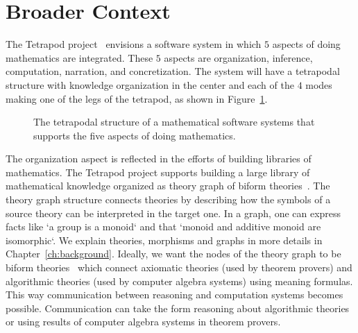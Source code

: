 \section{Broader Context}
\label{sec:broader_context}
The Tetrapod project~\cite{carette2020bigMath} envisions a software system in which $5$ aspects of doing mathematics are integrated. These $5$ aspects are organization, inference, computation, narration, and concretization. The system will have a tetrapodal structure with knowledge organization in the center and each of the $4$ modes making one of the legs of the tetrapod, as shown in Figure~\ref{fig:tetrapod}. 
\begin{figure}[h]
\caption{The tetrapodal structure of a mathematical software systems that supports the five aspects of doing mathematics. }
\label{fig:tetrapod}
\end{figure}

The organization aspect is reflected in the efforts of building libraries of mathematics. The Tetrapod project supports building a large library of mathematical knowledge organized as theory graph of biform theories~\cite{biformCICM2018}. The theory graph structure connects theories by describing how the symbols of a source theory can be interpreted in the target one. In a graph, one can express facts like `a group is a monoid` and that `monoid and additive monoid are isomorphic`. We explain theories, morphisms and graphs in more details in Chapter~\ref{ch:background}. 
Ideally, we want the nodes of the theory graph to be biform theories~\cite{biformCICM2018} which connect axiomatic theories  (used by theorem provers) and algorithmic theories (used by computer algebra systems) using meaning formulas. This way communication between reasoning and computation systems becomes possible. Communication can take the form reasoning about algorithmic theories or using results of computer algebra systems in theorem provers.  

